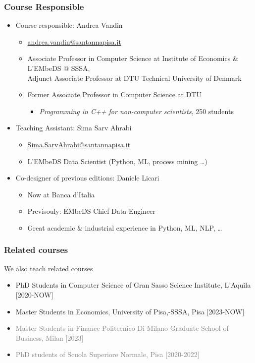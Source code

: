 \documentclass{beamer}%
\begin{document}
\begin{frame}
\frametitle{Course Responsible}
 \begin{itemize}
   \item Course responsible: Andrea Vandin
	\begin{itemize}
      \item\href{mailto:andrea.vandin@santannapisa.it}{\color{blue}andrea.vandin@santannapisa.it}
	  \item Associate Professor in Computer Science at Institute of Economics \& L'EMbeDS @ SSSA, \\ Adjunct Associate Professor at DTU Technical University of Denmark
	  \item Former Associate Professor in Computer Science at DTU
	  \begin{itemize}
      \item 
	   {\scriptsize \emph{Programming in C++ for non-computer scientists}, 250 students}
	  \end{itemize}
    \end{itemize}
      \item Teaching Assistant: Sima Sarv Ahrabi
\begin{itemize}
	\item \href{mailto:Sima.SarvAhrabi@santannapisa.it}{\color{blue}Sima.SarvAhrabi@santannapisa.it}
	\item L'EMbeDS Data Scientist (Python,  ML, process mining \ldots)
\end{itemize}
      \item Co-designer of previous editions: Daniele Licari 
\begin{itemize}
	\item Now at Banca d'Italia
	\item Previsouly: EMbeDS Chief Data Engineer
	\item Great academic \& industrial experience in Python, ML, NLP, \ldots
\end{itemize}
	\end{itemize}
\end{frame}

\begin{frame}
	\frametitle{Related courses}
	We also teach related courses
		\begin{itemize}
			\item PhD Students in Computer Science of Gran Sasso Science Institute, L'Aquila [2020-NOW]
			\item Master Students in Economics, University of Pisa,-SSSA, Pisa [2023-NOW]
			\item \textcolor{gray}{Master Students in Finance Politecnico Di Milano Graduate School of Business, Milan [2023]}
			\item \textcolor{gray}{PhD students of Scuola Superiore Normale, Pisa [2020-2022]}
		\end{itemize}
\end{frame}
\end{document}
